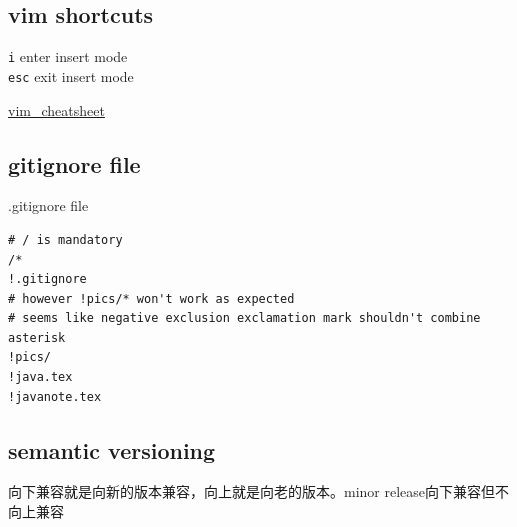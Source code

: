 \documentclass[a4paper, 12pt]{article}
\begin{document}
\subsection{vim shortcuts}
\noindent\verb|i| enter insert mode\\
\verb|esc| exit insert mode

\href{https://gist.github.com/awidegreen/3854277}{vim\_cheatsheet}

\subsection{gitignore file}

.gitignore file
\begin{verbatim}
# / is mandatory
/*
!.gitignore
# however !pics/* won't work as expected
# seems like negative exclusion exclamation mark shouldn't combine asterisk
!pics/
!java.tex
!javanote.tex
\end{verbatim}

\subsection{semantic versioning}
向下兼容就是向新的版本兼容，向上就是向老的版本。minor release向下兼容但不向上兼容
\end{document}
